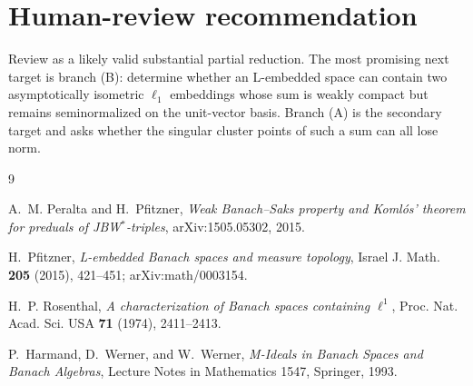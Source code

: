 \documentclass[11pt]{article}
\theoremstyle{definition}
\theoremstyle{remark}
\newcommand{\ellone}{\ell_1}
\begin{document}
\section{Human-review recommendation}

Review as a likely valid substantial partial reduction.  The most promising
next target is branch (B): determine whether an L-embedded space can contain
two asymptotically isometric $\ellone$ embeddings whose sum is weakly compact
but remains seminormalized on the unit-vector basis.  Branch (A) is the
secondary target and asks whether the singular cluster points of such a sum
can all lose norm.

\begin{thebibliography}{9}

A.~M. Peralta and H.~Pfitzner,
\emph{Weak Banach--Saks property and Koml\'os' theorem for preduals of
JBW$^*$-triples}, arXiv:1505.05302, 2015.

H.~Pfitzner,
\emph{L-embedded Banach spaces and measure topology},
Israel J. Math. \textbf{205} (2015), 421--451;
arXiv:math/0003154.

H.~P. Rosenthal,
\emph{A characterization of Banach spaces containing $\ell^1$},
Proc. Nat. Acad. Sci. USA \textbf{71} (1974), 2411--2413.

P.~Harmand, D.~Werner, and W.~Werner,
\emph{M-Ideals in Banach Spaces and Banach Algebras},
Lecture Notes in Mathematics 1547, Springer, 1993.

\end{thebibliography}
\end{document}

